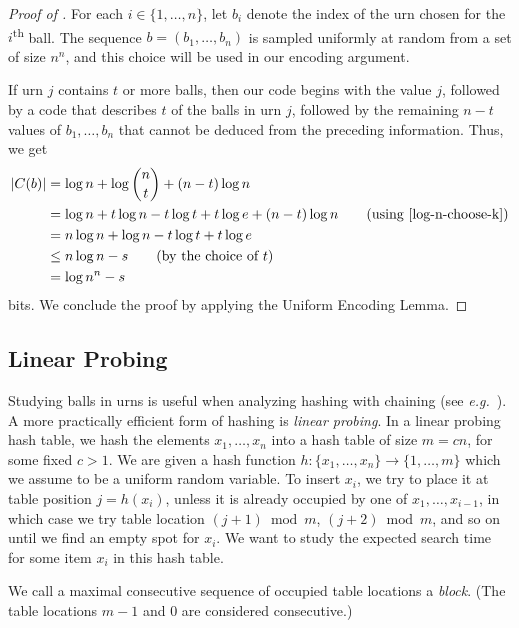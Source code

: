 \documentclass{patmorin}
\begin{document}
\begin{proof}[Proof of ]
  For each $i\in\{1,\ldots,n\}$, let $b_i$ denote the index of the urn
  chosen for the $i$\textsuperscript{th} ball. The
  sequence $b = (b_1,\ldots,b_n)$ is sampled uniformly at random from a
  set of size $n^n$, and this choice will be used in our
  encoding argument.

  If urn $j$ contains $t$ or more balls, then our code
  begins with the value $j$, followed by a code that describes $t$ of
  the balls in urn $j$, followed by the remaining $n-t$ values of
  $b_1,\ldots,b_n$ that cannot be deduced from the preceding
  information.  Thus, we get
  \begin{align*}
    |C(b)| &= \log n + \log\binom{n}{t} + (n-t)\log n \\
           &= \log n + t\log n - t\log t + t\log e + (n-t)\log n
             \tag{using \eqref{log-n-choose-k}} \\
           & = n \log n + \log n - t\log t + t\log e \\
           & \le n \log n - s \tag{by the choice of $t$} \\
           & = \log n^n - s
  \end{align*}
  bits. We conclude the proof by applying the Uniform Encoding Lemma.
\end{proof}

\subsection{Linear Probing}

Studying balls in urns is useful when analyzing hashing with
chaining (see \emph{e.g.}~\cite[Section~5.1]{morin:open}). A more
practically efficient form of hashing is \emph{linear probing}.  In a
linear probing hash table, we hash the elements $x_1, \ldots, x_n$
into a hash table of size $m=cn$, for some fixed $c> 1$. We are given
a hash function $h : \{x_1, \ldots, x_n\} \to \{1, \ldots, m\}$ which
we assume to be a uniform random variable. To insert $x_i$, we try to
place it at table position $j=h(x_i)$, unless it is already occupied
by one of $x_1,\ldots,x_{i-1}$, in which case we try table location
$(j+1)\bmod m$, $(j+2)\bmod m$, and so on until we find an empty spot
for $x_i$.  We want to study the expected search time for some item
$x_i$ in this hash table.

We call a maximal consecutive sequence of occupied table locations a
\emph{block}. (The table locations $m-1$ and $0$ are considered
consecutive.)
\end{document}
